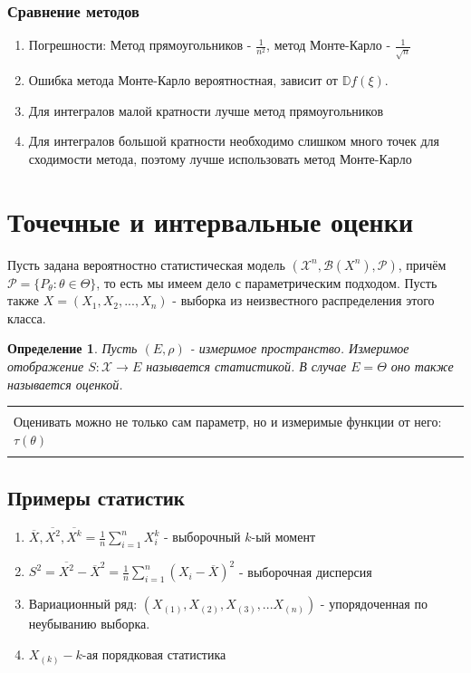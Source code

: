 \documentclass[a4paper,12pt]{article}
\newcommand{\disp}{\mathbb{D}}
\newcommand{\orst}[2]{#1_{(#2)}}
\newcommand{\sumin}{\sum\limits_{i=1}^n}
\newcommand{\sample}{X_1, X_2, ..., X_n}
\newenvironment{annotation}{\begin{center}
    \begin{tabular}{|p{0.9\textwidth}|}
    \hline\\
}
{ 
    \\\\\hline
    \end{tabular} 
    \end{center}
}
\newtheorem{dfn}{Определение}[section]
\theoremstyle{named}
\begin{document}
\subsubsection{Сравнение методов}
\begin{enumerate}
    \item Погрешности: Метод прямоугольников - $\frac{1}{n^2}$, метод Монте-Карло - $\frac{1}{\sqrt{n}}$
    \item Ошибка метода Монте-Карло вероятностная, зависит от $\disp f(\xi)$. 
    \item Для интегралов малой кратности лучше метод прямоугольников 
    \item Для интегралов большой кратности необходимо слишком много точек для сходимости метода, поэтому лучше использовать метод Монте-Карло 
\end{enumerate}

\section{Точечные и интервальные оценки}
Пусть задана вероятностно статистическая модель $(\mathcal{X}^n, \mathcal{B}(X^n), \mathcal{P})$, причём $\mathcal{P} = \{ P_\theta
: \theta \in \Theta\}$, то есть мы имеем дело с параметрическим подходом. Пусть также $X =(\sample)$ - выборка из 
неизвестного распределения этого класса. 
\begin{dfn}
    Пусть $(E, \rho)$ - измеримое пространство. Измеримое отображение $S: \mathcal{X} \to E$ называется статистикой. В случае 
    $E = \Theta$ оно также называется оценкой.
\end{dfn}
\begin{annotation}
    Оценивать можно не только сам параметр, но и измеримые функции от него: $\tau(\theta)$
\end{annotation}
\subsection*{Примеры статистик}
\begin{enumerate}
    \item $\overline{X}, \overline{X^2}, \overline{X^k} = \frac{1}{n}\sumin X_i^k$ - выборочный $k$-ый момент
    \item $S^2 = \overline{X^2} - \overline{X}^2 = \frac{1}{n}\sumin (X_i - \overline{X})^2$ - выборочная дисперсия
    \item Вариационный ряд: $(\orst{X}{1}, \orst{X}{2}, \orst{X}{3}, ...\orst{X}{n})$ - упорядоченная по неубыванию выборка. 
    \item $\orst{X}{k} - k$-ая порядковая статистика 
\end{enumerate}
\end{document}
